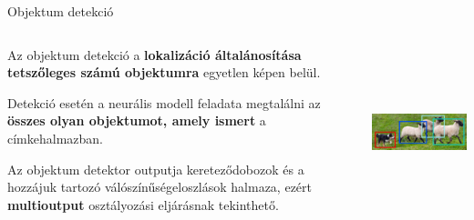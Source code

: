 \documentclass[english, aspectratio=169]{beamer}
\begin{document}
\begin{frame}{Objektum detekció}
\begin{columns}
\begin{column}{.5\textwidth}
Az objektum detekció a \textbf{lokalizáció általánosítása tetszőleges számú objektumra} egyetlen képen belül.\par\smallskip
Detekció esetén a neurális modell feladata megtalálni az \textbf{összes olyan objektumot, amely ismert} a címkehalmazban.\par\smallskip
Az objektum detektor outputja kereteződobozok és a hozzájuk tartozó válószínűségeloszlások halmaza, ezért \textbf{multioutput} osztályozási eljárásnak tekinthető.
\end{column}
\begin{column}{.5\textwidth}
\begin{center}
\includegraphics[height=5cm, width=7cm, keepaspectratio]{images/instance_3.png}
\end{center}
\end{column}
\end{columns}
\end{frame}
\end{document}
